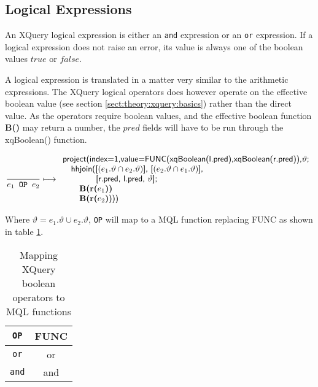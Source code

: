 \subsection{Logical Expressions}
\label{sect:trans:TD:logical}
An XQuery logical expression is either an \texttt{and} expression or an \texttt{or} expression. If a logical
expression does not raise an error, its value is always one of the boolean values $true$ or $false$.

A logical expression is translated in a matter very similar to the arithmetic expressions. The XQuery logical
operators does however operate on the effective boolean value (see section \ref{sect:theory:xquery:basics}) rather
than the direct value. As the operators require boolean values, and the effective boolean function \textbf{B()}
may return a number, the $pred$ fields will have to be run through the \textsf{xqBoolean()} function.

\begin{equation}
\frac{}{e_1 \mbox{\texttt{ OP }} e_2}\longmapsto
\begin{array}{l}
\mbox{\textsf{project(index=1,value=FUNC(xqBoolean(l.pred),xqBoolean(r.pred)),}}\vartheta\mbox{\textsf{;}} \\ \quad
\mbox{\textsf{hhjoin([}}(e_1.\vartheta\cap e_2.\vartheta)\mbox{\textsf{], [}}(e_2.\vartheta\cap e_1.\vartheta)
\mbox{\textsf{],}} 
\\ \quad \quad \quad \quad\mbox{\textsf{[r.pred, l.pred, }}\vartheta\mbox{\textsf{];}} \\ \quad \quad
\mbox{\textbf{B(r(}}e_1\mbox{\textbf{))}} \\ \quad \quad
\mbox{\textbf{B(r(}}e_2\mbox{\textbf{)}\textsf{)))}}
\end{array}
\label{rule:trans:TD:andOr}
\end{equation}

Where $\vartheta = e_1.\vartheta \cup e_2.\vartheta$, \texttt{OP} will map to a MQL function replacing
\textsf{FUNC} as shown in table \ref{tab:trans:TD:logMap}. 

\begin{table}[h]
\centering
\begin{tabular}{c|c}
\texttt{OP} & \textsf{FUNC} \\ \hline
\texttt{or} & \textsf{or} \\
\texttt{and} & \textsf{and} \\
\end{tabular}
\label{tab:trans:TD:logMap}
\caption{Mapping XQuery boolean operators to MQL functions}
\end{table}

